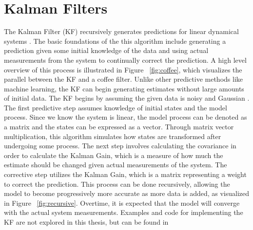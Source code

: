 \chapter{Kalman Filters}
\label{chap:three}


The Kalman Filter (KF) recursively generates predictions for linear dynamical systems \cite{inbook}. The basic foundations of the this algorithm include generating a prediction given some initial knowledge of the data and using actual measurements from the system to continually correct the prediction. A high level overview of this process is illustrated in Figure ~\ref{fig:coffee}, which visualizes the parallel between the KF and a coffee filter. 	Unlike other predictive methods like machine learning, the KF can begin generating estimates without large amounts of initial data. The KF begins by assuming the given data is noisy and Gaussian \cite{inproceedings, article7}. The first predictive step assumes knowledge of initial states and the model process. Since we know the system is linear, the model process can be denoted as a matrix and the states can be expressed as a vector. Through matrix vector multiplication, this algorithm simulates how states are transformed after undergoing some process. The next step involves calculating the covariance in order to calculate the Kalman Gain, which is a measure of how much the estimate should be changed given actual measurements of the system. The corrective step utilizes the Kalman Gain, which is a matrix representing a weight to correct the prediction. This process can be done recursively, allowing the model to become progressively more accurate as more data is added, as visualized in Figure ~\ref{fig:recursive}. Overtime, it is expected that the model will converge with the actual system measurements. Examples and code for implementing the KF are not explored in this thesis, but can be found in \cite{article7}
\\  \\

